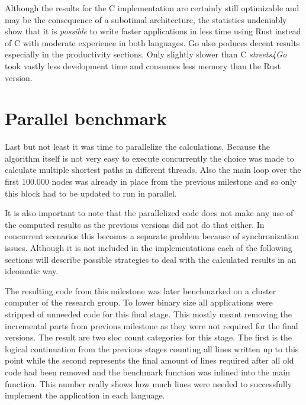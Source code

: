 Although the results for the C implementation are certainly still optimizable and may be the consequence of a subotimal architecture, the statistics undeniably show that it is \textit{possible} to write faster applications in less time using Rust instead of C with moderate experience in both languages. Go also poduces decent results especially in the productivity sections. Only slightly slower than C \textit{streets4Go} took vastly less development time and consumes less memory than the Rust version.

\section{Parallel benchmark}
\label{sec:Implementation::ParallelBenchmark}

Last but not least it was time to parallelize the calculations. Because the algorithm itself is not very easy to execute concurrently the choice was made to calculate multiple shortest paths in different threads. Also the main loop over the first 100.000 nodes was already in place from the previous milestone and so only this block had to be updated to run in parallel.

It is also important to note that the parallelized code does not make any use of the computed results as the previous versions did not do that either. In concurrent scenarios this becomes a separate problem because of synchronization issues. Although it is not included in the implementations each of the following sections will describe possible strategies to deal with the calculated results in an ideomatic way.

The resulting code from this milestone was later benchmarked on a cluster computer of the research group. To lower binary size all applications were stripped of unneeded code for this final stage. This mostly meant removing the incremental parts from previous milestone as they were not required for the final versions. The result are two \gls{sloc} count categories for this stage. The first is the logical continuation from the previous stages counting all lines written up to this point while the second represents the final amount of lines required after all old code had been removed and the benchmark function was inlined into the main function. This number really shows how much lines were needed to successfully implement the application in each language.

